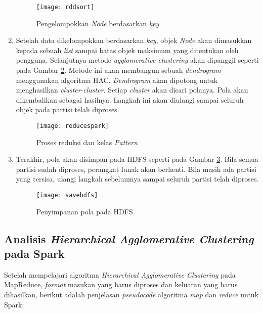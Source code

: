 \begin{enumerate}
\begin{figure}[H]
    \centering  
    \texttt{[image: rddsort]}  
    \caption[Pengelompokkan \textit{Node} berdasarkan \textit{key}]{Pengelompokkan \textit{Node} berdasarkan \textit{key}} 
    \label{fig:rddsort} 
\end{figure}

\item Setelah data dikelompokkan berdasarkan \textit{key}, objek \textit{Node} akan dimasukkan kepada sebuah \textit{list} sampai batas objek maksimum yang ditentukan oleh pengguna. Selanjutnya metode \textit{agglomerative clustering} akan dipanggil seperti pada Gambar \ref{fig:reducespark}. Metode ini akan membangun sebuah \textit{dendrogram} menggunakan algoritma HAC. \textit{Dendrogram} akan dipotong untuk menghasilkan \textit{cluster}-\textit{cluster}. Setiap \textit{cluster} akan dicari polanya. Pola akan dikembalikan sebagai hasilnya. Langkah ini akan diulangi sampai seluruh objek pada partisi telah diproses.

\begin{figure}[H]
    \centering  
    \texttt{[image: reducespark]}  
    \caption[Proses reduksi dan kelas \textit{Pattern}]{Proses reduksi dan kelas \textit{Pattern}} 
    \label{fig:reducespark} 
\end{figure}


\item Terakhir, pola akan disimpan pada HDFS seperti pada Gambar \ref{fig:savehdfs}. Bila semua partisi sudah diproses, perangkat lunak akan berhenti. Bila masih ada partisi yang tersisa, ulangi langkah sebelumnya sampai seluruh partisi telah diproses.

\begin{figure}[H]
    \centering  
    \texttt{[image: savehdfs]}  
    \caption[Penyimpanan pola pada HDFS]{Penyimpanan pola pada HDFS} 
    \label{fig:savehdfs} 
\end{figure}

\end{enumerate}

\subsection{Analisis \textit{Hierarchical Agglomerative Clustering} pada Spark}

Setelah mempelajari algoritma \textit{Hierarchical Agglomerative Clustering} pada MapReduce, \textit{format} masukan yang harus diproses dan keluaran yang harus dihasilkan, berikut adalah penjelasan \textit{pseudocode} algoritma \textit{map} dan \textit{reduce} untuk Spark:\\

